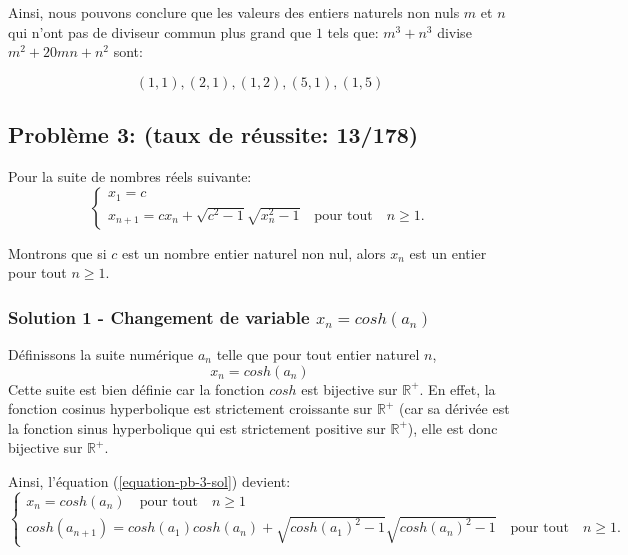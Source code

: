 \documentclass[12pt,a4paper,article]{memoir}
\begin{document}
\bigskip

Ainsi, nous pouvons conclure que les valeurs des entiers naturels non nuls $m$ et $n$ qui n'ont pas de diviseur commun plus grand que $1$ tels que: $m^3 + n^3$ divise $m^2+20mn+n^2$ sont: 

\bigskip

\begin{equation}
(1,1), (2, 1), (1, 2), (5, 1), (1, 5)
\label{equation-pb-2-sol-1-res}
\end{equation}

\subsection{Problème 3: (taux de réussite: 13/178)}
Pour la suite de nombres réels suivante:
\begin{equation}
\left\{
	\begin{array}{l}
	x_1 = c \\
	x_{n+1} = cx_{n} + \sqrt{c^2 - 1}\sqrt{x_{n}^2 - 1}  \quad \textrm{pour tout} \quad n \geq 1.
	\end{array}
\right.
\label{equation-pb-3-sol}
\end{equation}

Montrons que si $c$ est un nombre entier naturel non nul, alors $x_{n}$ est un entier pour tout $n \geq 1$.
\subsubsection{Solution 1 - Changement de variable $x_n = cosh(a_n)$}
Définissons la suite numérique $a_n$ telle que pour tout entier naturel $n$,
\[x_n = cosh(a_n)\]
Cette suite est bien définie car la fonction $cosh$ est bijective sur $\mathbb{R^{+}}$.
En effet, la fonction cosinus hyperbolique est strictement croissante sur $\mathbb{R^{+}}$ (car sa dérivée est la fonction sinus hyperbolique qui est strictement positive sur $\mathbb{R^{+}}$), elle est donc bijective sur $\mathbb{R^{+}}$.

\bigskip

Ainsi, l'équation (\ref{equation-pb-3-sol}) devient:
\begin{equation}
\left\{
	\begin{array}{l}
	x_n = cosh(a_n) \quad \textrm{pour tout} \quad n \geq 1\\
	cosh(a_{n+1}) = cosh(a_1)cosh(a_{n}) + \sqrt{cosh(a_1)^2 - 1}\sqrt{cosh(a_{n})^2 - 1}  \quad \textrm{pour tout} \quad n \geq 1.
	\end{array}
\right.
\label{equation-pb-3-sol-cosh}
\end{equation}
\end{document}
